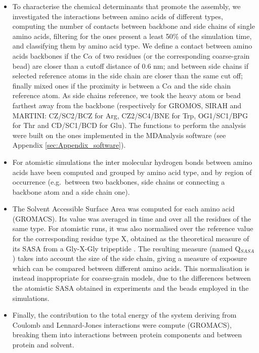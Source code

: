 \begin{itemize}
\item To characterise the chemical determinants that promote the assembly, we investigated the interactions between amino acids of different types, computing the number of contacts between backbone and side chains of single amino acids, filtering for the ones present a least 50\% of the simulation time, and classifying them by amino acid type.
%
We define a contact between amino acids backbones if the C$\alpha$ of two residues (or the corresponding coarse-grain bead) are closer than a cutoff distance of 0.6 nm; and between side chains if selected reference atoms in the side chain are closer than the same cut off; finally mixed ones if the proximity is between a C$\alpha$ and the side chain reference atom. As side chains reference, we took the heavy atom or bead farthest away from the backbone (respectively for GROMOS, SIRAH and MARTINI: CZ/SC2/BCZ for Arg, CZ2/SC4/BNE for Trp, OG1/SC1/BPG for Thr and CD/SC1/BCD for Glu). The functions to perform the analysis were built on the ones implemented in the MDAnalysis software (see Appendix \ref{sec:Appendix_software}).

\item For atomistic simulations the inter molecular hydrogen bonds between amino acids have been computed and grouped by amino acid type, and by region of occurrence (e.g.\ between two backbones, side chains or connecting a backbone atom and a side chain one).

\item The Solvent Accessible Surface Area was computed for each amino acid (GROMACS). Its value was averaged in time and over all the residues of the same type. For atomistic runs, it was also normalised over the reference value for the corresponding residue type X, obtained as the theoretical measure of its SASA from a Gly-X-Gly tripeptide \citep{Tien2013}. The resulting measure (named Q$_{SASA}$) takes into account the size of the side chain, giving a measure of exposure which can be compared between different amino acids. 
%
This normalisation is instead inappropriate for coarse-grain models, due to the differences between the atomistic SASA obtained in experiments and the beads employed in the simulations.

\item Finally, the contribution to the total energy of the system deriving from Coulomb and Lennard-Jones interactions were compute (GROMACS), breaking them into interactions between protein components and between protein and solvent.
\end{itemize}

